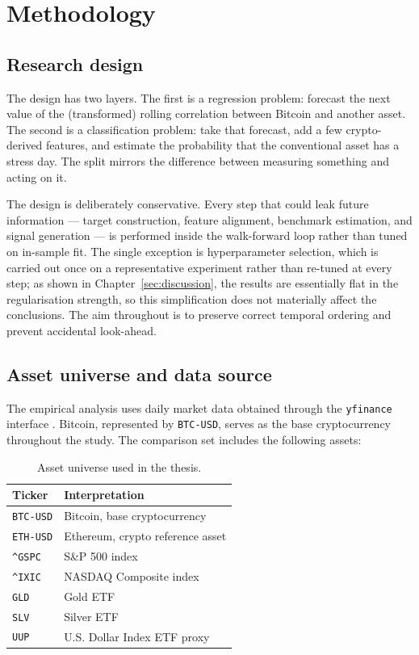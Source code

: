 \section{Methodology}

\subsection{Research design}

The design has two layers. The first is a regression problem: forecast the next value of the (transformed) rolling correlation between Bitcoin and another asset. The second is a classification problem: take that forecast, add a few crypto-derived features, and estimate the probability that the conventional asset has a stress day. The split mirrors the difference between measuring something and acting on it.

The design is deliberately conservative. Every step that could leak future information --- target construction, feature alignment, benchmark estimation, and signal generation --- is performed inside the walk-forward loop rather than tuned on in-sample fit. The single exception is hyperparameter selection, which is carried out once on a representative experiment rather than re-tuned at every step; as shown in Chapter~\ref{sec:discussion}, the results are essentially flat in the regularisation strength, so this simplification does not materially affect the conclusions. The aim throughout is to preserve correct temporal ordering and prevent accidental look-ahead.

\subsection{Asset universe and data source}

The empirical analysis uses daily market data obtained through the \texttt{yfinance} interface \cite{yfinance2026}. Bitcoin, represented by \texttt{BTC-USD}, serves as the base cryptocurrency throughout the study. The comparison set includes the following assets:

\begin{table}[H]
    \centering
    \caption{Asset universe used in the thesis.}
    \label{tab:asset_universe}
    \begin{tabular}{ll}
        \toprule
        Ticker & Interpretation \\
        \midrule
        \texttt{BTC-USD} & Bitcoin, base cryptocurrency \\
        \texttt{ETH-USD} & Ethereum, crypto reference asset \\
        \texttt{\textasciicircum{}GSPC} & S\&P 500 index \\
        \texttt{\textasciicircum{}IXIC} & NASDAQ Composite index \\
        \texttt{GLD} & Gold ETF \\
        \texttt{SLV} & Silver ETF \\
        \texttt{UUP} & U.S. Dollar Index ETF proxy \\
        \bottomrule
    \end{tabular}
\end{table}

